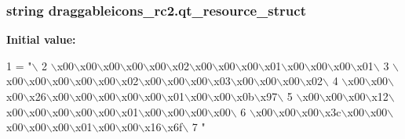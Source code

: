 \subsubsection[{qt\+\_\+resource\+\_\+struct}]{\setlength{\rightskip}{0pt plus 5cm}string draggableicons\+\_\+rc2.\+qt\+\_\+resource\+\_\+struct}\label{namespacedraggableicons__rc2_a7737c79d3763870f8f145412f679d3e5}
{\bfseries Initial value\+:}
\begin{DoxyCode}
1 = \textcolor{stringliteral}{"\(\backslash\)}
2 \textcolor{stringliteral}{\(\backslash\)x00\(\backslash\)x00\(\backslash\)x00\(\backslash\)x00\(\backslash\)x00\(\backslash\)x02\(\backslash\)x00\(\backslash\)x00\(\backslash\)x00\(\backslash\)x01\(\backslash\)x00\(\backslash\)x00\(\backslash\)x00\(\backslash\)x01\(\backslash\)}
3 \textcolor{stringliteral}{\(\backslash\)x00\(\backslash\)x00\(\backslash\)x00\(\backslash\)x00\(\backslash\)x00\(\backslash\)x02\(\backslash\)x00\(\backslash\)x00\(\backslash\)x00\(\backslash\)x03\(\backslash\)x00\(\backslash\)x00\(\backslash\)x00\(\backslash\)x02\(\backslash\)}
4 \textcolor{stringliteral}{\(\backslash\)x00\(\backslash\)x00\(\backslash\)x00\(\backslash\)x26\(\backslash\)x00\(\backslash\)x00\(\backslash\)x00\(\backslash\)x00\(\backslash\)x00\(\backslash\)x01\(\backslash\)x00\(\backslash\)x00\(\backslash\)x0b\(\backslash\)x97\(\backslash\)}
5 \textcolor{stringliteral}{\(\backslash\)x00\(\backslash\)x00\(\backslash\)x00\(\backslash\)x12\(\backslash\)x00\(\backslash\)x00\(\backslash\)x00\(\backslash\)x00\(\backslash\)x00\(\backslash\)x01\(\backslash\)x00\(\backslash\)x00\(\backslash\)x00\(\backslash\)x00\(\backslash\)}
6 \textcolor{stringliteral}{\(\backslash\)x00\(\backslash\)x00\(\backslash\)x00\(\backslash\)x3c\(\backslash\)x00\(\backslash\)x00\(\backslash\)x00\(\backslash\)x00\(\backslash\)x00\(\backslash\)x01\(\backslash\)x00\(\backslash\)x00\(\backslash\)x16\(\backslash\)x6f\(\backslash\)}
7 \textcolor{stringliteral}{"}
\end{DoxyCode}
